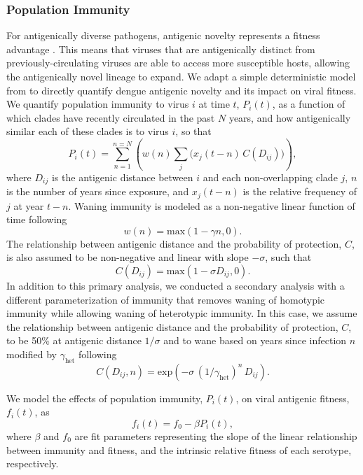 \documentclass[11pt,oneside,letterpaper]{article}
\begin{document}
\subsubsection*{Population Immunity}
For antigenically diverse pathogens, antigenic novelty represents a fitness advantage \citep{lipsitch2007patterns}.
This means that viruses that are antigenically distinct from previously-circulating viruses are able to access more susceptible hosts, allowing the antigenically novel lineage to expand.
We adapt a simple deterministic model from \citet{luksza2014predictive} to directly quantify dengue antigenic novelty and its impact on viral fitness.
We quantify population immunity to virus $i$ at time $t$, $P_i(t)$, as a function of which clades have recently circulated in the past $N$ years, and how antigenically similar each of these clades is to virus $i$, so that
\begin{equation}
  \label{eq_population_immunity}
P_i(t) = \sum_{n=1}^{n=N} \left(w(n)  \sum_{j} \Big( x_j(t-n) \, C( D_{ij}) \Big) \right),
\end{equation}
where $D_{ij}$ is the antigenic distance between $i$ and each non-overlapping clade $j$, $n$ is the number of years since exposure, and $x_j(t-n)$ is the relative frequency of $j$ at year $t-n$.
Waning immunity is modeled as a non-negative linear function of time following
\begin{equation}
\label{eq_waning_immunity}
  w(n) = \mathrm{max}(1 - \gamma n, 0).
\end{equation}
The relationship between antigenic distance and the probability of protection, $C$, is also assumed to be non-negative and linear with slope $-\sigma$, such that
\begin{equation}
C(D_{ij}) = \mathrm{max}(1 - \sigma D_{ij}, 0).
\end{equation}
In addition to this primary analysis, we conducted a secondary analysis with a different parameterization of immunity that removes waning of homotypic immunity while allowing waning of heterotypic immunity.
In this case, we assume the relationship between antigenic distance and the probability of protection, $C$, to be 50\% at antigenic distance $1/\sigma$ and to wane based on years since infection $n$ modified by $\gamma_{\mathrm{het}}$ following
\begin{equation}
C(D_{ij}, n) = \mathrm{exp}\left(- \sigma \, (1/\gamma_{\mathrm{het}})^n \, D_{ij}\right).
\end{equation}

We model the effects of population immunity, $P_i(t)$, on viral antigenic fitness, $f_i(t)$, as
\begin{equation}
  \label{eq_fitness}
f_i(t) = f_0-\beta P_i(t),
\end{equation}
where $\beta$ and $f_0$ are fit parameters representing the slope of the linear relationship between immunity and fitness, and the intrinsic relative fitness of each serotype, respectively.
\end{document}

